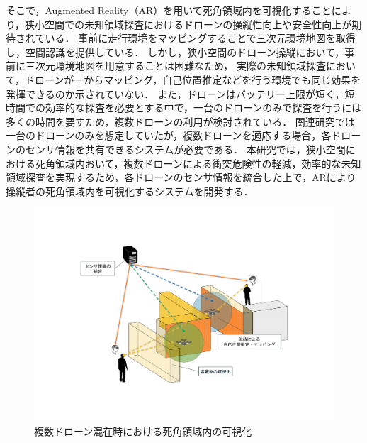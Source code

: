 \documentclass[a4paper,10pt,twocolumn,uplatex]{jsarticle}
\begin{document}
\par
そこで，Augmented Reality（AR）を用いて死角領域内を可視化することにより，狭小空間での未知領域探査におけるドローンの操縦性向上や安全性向上が期待されている\cite{Erat}．
事前に走行環境をマッピングすることで三次元環境地図を取得し，空間認識を提供している．
しかし，狭小空間のドローン操縦において，事前に三次元環境地図を用意することは困難なため，
実際の未知領域探査において，ドローンが一からマッピング，自己位置推定などを行う環境でも同じ効果を発揮できるのか示されていない．
また，ドローンはバッテリー上限が短く，短時間での効率的な探査を必要とする中で\cite{Gupta}，一台のドローンのみで探査を行うには多くの時間を要すため，複数ドローンの利用が検討されている．
関連研究では一台のドローンのみを想定していたが，複数ドローンを適応する場合，各ドローンのセンサ情報を共有できるシステムが必要である．
本研究では，狭小空間における死角領域内おいて，複数ドローンによる衝突危険性の軽減，効率的な未知領域探査を実現するため，各ドローンのセンサ情報を統合した上で，ARにより操縦者の死角領域内を可視化するシステムを開発する．


\begin{figure}[!tb]
  \centering
  \includegraphics[width=\linewidth]{img/outline.pdf}
  \caption{複数ドローン混在時における死角領域内の可視化}
  \label{fig:outline}
\end{figure}


\end{document}

